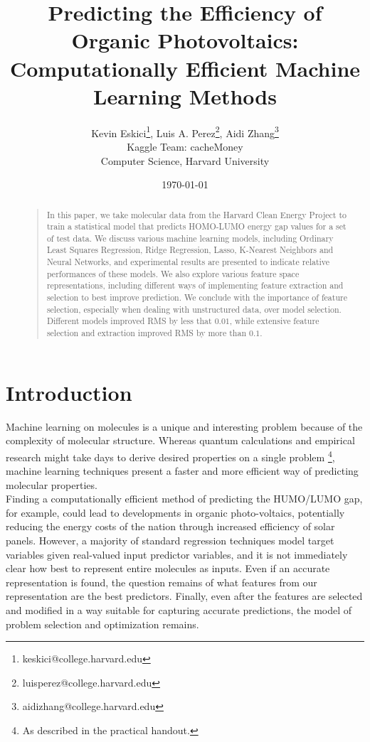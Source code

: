 \documentclass[letterpaper]{article}
\title{Predicting the Efficiency 
of Organic Photovoltaics: \\
Computationally Efficient Machine Learning Methods
}
\author{Kevin Eskici\thanks{keskici@college.harvard.edu}, Luis A. Perez\thanks{luisperez@college.harvard.edu}, Aidi Zhang\thanks{aidizhang@college.harvard.edu} \\
Kaggle Team: cacheMoney \\
Computer Science, Harvard University}
\date{\today}
\begin{document}
\maketitle

\begin{abstract}
\begin{quote}
In this paper, we take molecular data from the Harvard Clean Energy Project to train a statistical model that predicts HOMO-LUMO energy gap values for a set of test data. We discuss various machine learning models, including Ordinary Least Squares Regression, Ridge Regression, Lasso, K-Nearest Neighbors and Neural Networks, and experimental results are presented to indicate relative performances of these models. We also explore various feature space representations, including different ways of implementing feature extraction and selection to best improve prediction. We conclude with the importance of feature selection, especially when dealing with unstructured data, over model selection. Different models improved RMS by less that $0.01$, while extensive feature selection and extraction improved RMS by more than $0.1$.
\end{quote}
\end{abstract}

\section{Introduction}
Machine learning on molecules is a unique and interesting problem because of the complexity of molecular structure. Whereas quantum calculations and empirical research might take days to derive desired properties on a single problem \footnote{As described in the practical handout.}, machine learning techniques present a faster and more efficient way of predicting molecular properties.\\

\noindent Finding a computationally efficient method of predicting the HUMO/LUMO gap, for example, could lead to developments in organic photo-voltaics, potentially reducing the energy costs of the nation through increased efficiency of solar panels. However, a majority of standard regression techniques model target variables given real-valued input predictor variables, and it is not immediately clear how best to represent entire molecules as inputs. Even if an accurate representation is found, the question remains of what features from our representation are the best predictors. Finally, even after the features are selected and modified in a way suitable for capturing accurate predictions, the model of problem selection and optimization remains.\\
\end{document}
